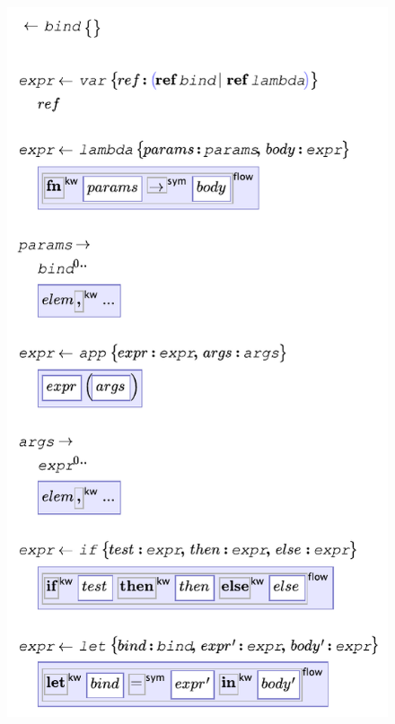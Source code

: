 \begin{figure}
  
  \begin{minipage}[t]{0.48\linewidth}
  \vspace{0pt}
  \includegraphics[scale=0.65]{src/image/kernel2.pdf}
  \end{minipage}
  \begin{minipage}[t]{0.48\linewidth}

\end{minipage}
\end{figure}

